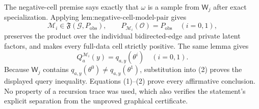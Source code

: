 The negative-cell premise says exactly that \(\omega\) is a sample from \(\mathsf W_j\) after exact specialization. Applying \(\text{lem:negative-cell-model-pair}\) gives
\[
\mathcal M_i\in\mathfrak F(\mathcal G,P_{\mathrm{obs}}),
\qquad
P_{\mathcal M_i}(\mathcal O)=P_{\mathrm{obs}}
\quad(i=0,1),
\tag{1}
\]
preserves the product over the individual bidirected-edge and private latent factors, and makes every full-data cell strictly positive. The same lemma gives
\[
Q_a^{\mathcal M_i}(y)=q_{a,y}(\theta^i)
\quad(i=0,1).
\tag{2}
\]
Because \(\mathsf W_j\) contains \(q_{a,y}(\theta^0)\neq q_{a,y}(\theta^1)\), substitution into (2) proves the displayed query inequality. Equations (1)--(2) prove every affirmative conclusion. No property of a recursion trace was used, which also verifies the statement's explicit separation from the unproved graphical certificate.